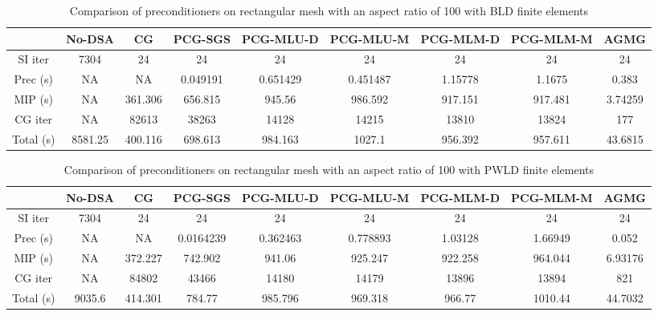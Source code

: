 \begin{landscape}
\begin{center}
\begin{table}[H]
      \label{bld_ar_6}      
    \end{table}
    \begin{table}[H]
    \caption{Comparison of preconditioners on rectangular mesh with an aspect ratio of 100 with BLD finite elements}  
      \begin{tabular}{|c|c|c|c|c|c|c|c|c|}
        \hline
        & No-DSA & CG & PCG-SGS & PCG-MLU-D & PCG-MLU-M & PCG-MLM-D & PCG-MLM-M & AGMG \\
        \hline
        SI iter    & 7304    & 24      & 24       & 24       & 24       & 24      & 24      & 24      \\
        Prec (s)   & NA      & NA      & 0.049191 & 0.651429 & 0.451487 & 1.15778 & 1.1675  & 0.383   \\
        MIP (s)    & NA      & 361.306 & 656.815  & 945.56   & 986.592  & 917.151 & 917.481 & 3.74259 \\
        CG iter    & NA      & 82613   & 38263    & 14128    & 14215    & 13810   & 13824   & 177     \\
        Total (s)  & 8581.25 & 400.116 & 698.613  & 984.163  & 1027.1   & 956.392 & 957.611 & 43.6815 \\
        \hline
      \end{tabular}
      \label{bld_ar_100}      
    \end{table}
    \begin{table}[H]
    \caption{Comparison of preconditioners on rectangular mesh with an aspect ratio of 100 with PWLD finite elements}  
      \begin{tabular}{|c|c|c|c|c|c|c|c|c|}
        \hline
        & No-DSA & CG & PCG-SGS & PCG-MLU-D & PCG-MLU-M & PCG-MLM-D & PCG-MLM-M & AGMG \\
        \hline
        SI iter    & 7304   & 24      & 24        & 24       & 24       & 24      & 24      & 24      \\
        Prec (s)   & NA     & NA      & 0.0164239 & 0.362463 & 0.778893 & 1.03128 & 1.66949 & 0.052   \\
        MIP (s)    & NA     & 372.227 & 742.902   & 941.06   & 925.247  & 922.258 & 964.044 & 6.93176 \\
        CG iter    & NA     & 84802   & 43466     & 14180    & 14179    & 13896   & 13894   & 821     \\
        Total (s)  & 9035.6 & 414.301 & 784.77    & 985.796  & 969.318  & 966.77  & 1010.44 & 44.7032 \\
        \hline
      \end{tabular}
      \label{pwld_ar_100}      
    \end{table}
  \end{center}
\end{landscape}
